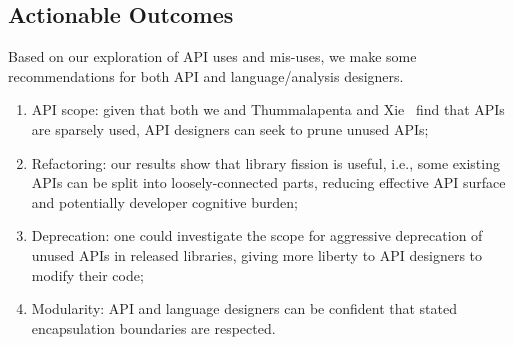 \subsection{Actionable Outcomes}
Based on our exploration of API uses and mis-uses, we make some recommendations
for both API and language/analysis designers.

\begin{enumerate}
\item API scope: given that both we and Thummalapenta and Xie~\cite{thummalapenta08:_spotw} find
that APIs are sparsely used, API designers can seek to prune unused APIs;
\item Refactoring: our results show that library fission is useful, i.e., some existing APIs can be split into loosely-connected parts, reducing effective API surface and potentially developer cognitive burden;
\item Deprecation: one could investigate the scope for aggressive deprecation of unused APIs in released libraries, giving more liberty to API designers to modify their code;
\item Modularity: API and language designers can be confident that stated encapsulation boundaries are respected.
\end{enumerate}



